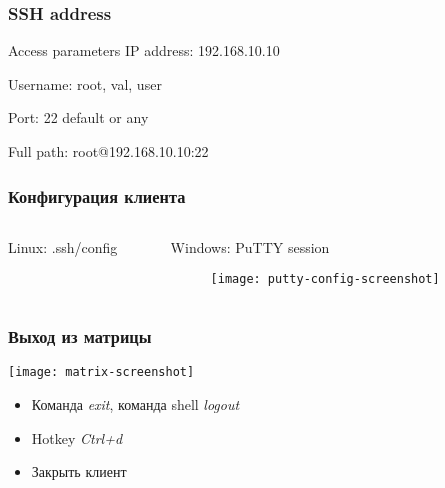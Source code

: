 \begin{frame}[fragile]
  \frametitle{SSH address}

\begin{block}{Access parameters}
    IP address: 192.168.10.10 \par
    Username: root, val, user \par
    Port: 22 default or any \par
\end{block}
    Full path: root@192.168.10.10:22
\end{frame}

\begin{frame}
  \frametitle{Конфигурация клиента}
\begin{columns}
    \begin{column}{0.5\textwidth}
      {\Large Linux: .ssh/config}
       
    \end{column}
    \begin{column}{0.5\textwidth}  %
   {\Large Windows: PuTTY session}
        \begin{figure}
        \centering
            \texttt{[image: putty-config-screenshot]} 
        \end{figure}
    \end{column}
\end{columns}
\end{frame}

\begin{frame}
  \frametitle{Выход из матрицы}

  \begin{center}
    \texttt{[image: matrix-screenshot]}
    \pause
    \newline
    \begin{itemize}
      \item Команда \emph{exit}, команда shell \emph{logout}
      \item Hotkey \emph{Ctrl+d}
      \item Закрыть клиент
    \end{itemize}
  \end{center}

\end{frame}
